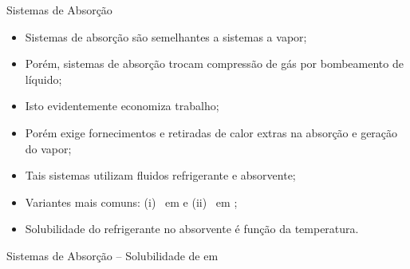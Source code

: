     \begin{frame}{Sistemas de Absorção}\vspace*{-0em}
        \begin{itemize}
            \item<1-> Sistemas de \alert{absorção} são semelhantes a sistemas a \alert{vapor};
                \\[\medskipamount]
            \item<2-> Porém, sistemas de absorção trocam \alert{compressão de gás} por
                \alert{bombeamento} de líquido;
                \\[\medskipamount]
            \item<3-> Isto evidentemente \alert{economiza trabalho};
                \\[\medskipamount]
            \item<4-> Porém exige \alert{fornecimentos e retiradas de calor} extras na
                \alert{absorção} e \alert{geração} do vapor;
                \\[\medskipamount]
            \item<5-> Tais sistemas utilizam fluidos \alert{refrigerante} e \alert{absorvente};
                \\[\medskipamount]
            \item<6-> Variantes \alert{mais comuns}: (i)~\alert{ em } e
                (ii)~\alert{ em };
                \\[\medskipamount]
            \item<7-> Solubilidade do refrigerante no absorvente é \alert{função da
                temperatura}.
        \end{itemize}
    \end{frame}
    \begin{frame}{Sistemas de Absorção -- Solubilidade de  em }\vspace*{-0em}
        \begin{columns}
        \end{columns}
    \end{frame}
